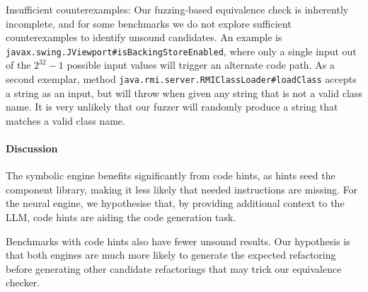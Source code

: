 \documentclass[sigconf,review,anonymous]{acmart}
\begin{document}
Insufficient counterexamples: Our fuzzing-based equivalence check is inherently
incomplete, and for some benchmarks we do not explore sufficient counterexamples
to identify unsound candidates. An example 
is \lstinline[breaklines=true]{javax.swing.JViewport#isBackingStoreEnabled}, where only a single input
out of the $2^{32}-1$ possible input values will trigger an alternate code path.
As a second exemplar, method \lstinline[breaklines=true]{java.rmi.server.RMIClassLoader#loadClass}
accepts a string as an input, but will throw when given any string
that is not a valid class name. %
It is very unlikely that our fuzzer will randomly produce a string that matches a valid class
name.

\paragraph{Discussion}

The symbolic engine benefits significantly from code hints, as hints seed
the component library, making it less likely that needed instructions are
missing.  For the neural engine, we hypothesise that, by providing
additional context to the LLM, code hints are aiding the code generation
task.

Benchmarks with code hints also have fewer unsound results.  Our hypothesis
is that both engines are much more likely to generate the expected
refactoring before generating other candidate refactorings that may trick
our equivalence checker.

%
%
%
%
\end{document}
